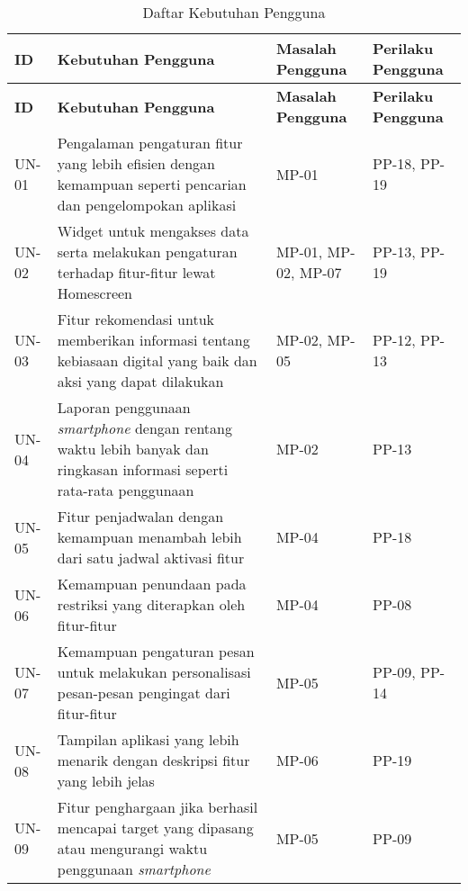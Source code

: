 
\RaggedLeft
\begin{footnotesize}
\begin{longtable}[c]{|W{c}{0.07\textwidth}|>{\ccnormspacing}m{0.55\textwidth}|>{\ccnormspacingcenter}m{0.125\textwidth}|>{\ccnormspacingcenter}m{0.125\textwidth}|}
  \caption{Daftar Kebutuhan Pengguna}
  \label{tab:daftar_kebutuhan} \\
  \hline {}
  \textbf{ID} & \centering\textbf{Kebutuhan Pengguna} & \textbf{Masalah Pengguna} & \textbf{Perilaku Pengguna} \\ \hline \endfirsthead
  \hline {}
  \textbf{ID} & \centering\textbf{Kebutuhan Pengguna} & \textbf{Masalah Pengguna} & \textbf{Perilaku Pengguna} \\ \hline \endhead

  \hline \endfoot

  UN-01  & Pengalaman pengaturan fitur yang lebih efisien dengan kemampuan seperti pencarian dan pengelompokan aplikasi & MP-01 & PP-18, PP-19 \\ \hline
  UN-02  & Widget untuk mengakses data serta melakukan pengaturan terhadap fitur-fitur lewat Homescreen & MP-01, MP-02, MP-07 & PP-13, PP-19 \\ \hline
  UN-03  & Fitur rekomendasi untuk memberikan informasi tentang kebiasaan digital yang baik dan aksi yang dapat dilakukan & MP-02, MP-05 & PP-12, PP-13 \\ \hline
  UN-04  & Laporan penggunaan \textit{smartphone} dengan rentang waktu lebih banyak dan ringkasan informasi seperti rata-rata penggunaan & MP-02 & PP-13 \\ \hline
  UN-05  & Fitur penjadwalan dengan kemampuan menambah lebih dari satu jadwal aktivasi fitur & MP-04 & PP-18  \\ \hline
  UN-06  & Kemampuan penundaan pada restriksi yang diterapkan oleh fitur-fitur & MP-04 & PP-08 \\ \hline
  UN-07  & Kemampuan pengaturan pesan untuk melakukan personalisasi pesan-pesan pengingat dari fitur-fitur & MP-05 & PP-09, PP-14 \\ \hline
  UN-08  & Tampilan aplikasi yang lebih menarik dengan deskripsi fitur yang lebih jelas & MP-06 & PP-19 \\ \hline
  UN-09  & Fitur penghargaan jika berhasil mencapai target yang dipasang atau mengurangi waktu penggunaan \textit{smartphone} & MP-05 & PP-09 \\ \hline
\end{longtable}
\end{footnotesize}
\justifying
\FloatBarrier

